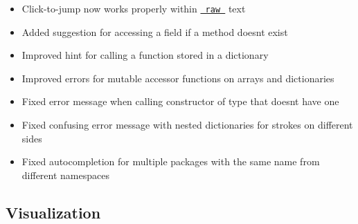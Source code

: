 \begin{itemize}
\tightlist
\item
  Click-to-jump now works properly within
  \href{/docs/reference/text/raw/}{\texttt{\ raw\ }} text
\item
  Added suggestion for accessing a field if a method
  doesn\textquotesingle t exist
\item
  Improved hint for calling a function stored in a dictionary
\item
  Improved errors for mutable accessor functions on arrays and
  dictionaries
\item
  Fixed error message when calling constructor of type that
  doesn\textquotesingle t have one
\item
  Fixed confusing error message with nested dictionaries for strokes on
  different sides
\item
  Fixed autocompletion for multiple packages with the same name from
  different namespaces
\end{itemize}

\subsection{Visualization}\label{visualization}

